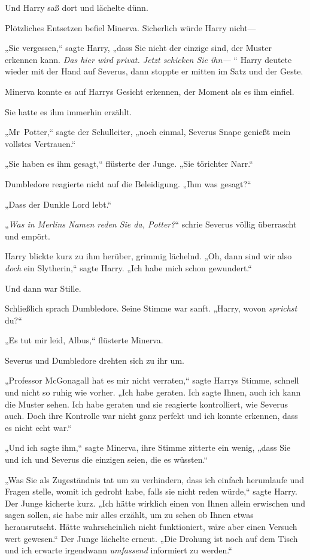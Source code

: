 {Und Harry saß dort und lächelte dünn.

Plötzliches Entsetzen befiel Minerva. Sicherlich würde Harry nicht—

„Sie vergessen,“ sagte Harry, „dass Sie nicht der einzige sind, der Muster erkennen kann. \emph{Das hier wird privat. Jetzt schicken Sie ihn—} “ Harry deutete wieder mit der Hand auf Severus, dann stoppte er mitten im Satz und der Geste.

Minerva konnte es auf Harrys Gesicht erkennen, der Moment als es ihm einfiel.

Sie hatte es ihm immerhin erzählt.

„Mr~Potter,“ sagte der Schulleiter, „noch einmal, Severus Snape genießt mein vollstes Vertrauen.“

„Sie haben es ihm gesagt,“ flüsterte der Junge. „Sie törichter Narr.“

Dumbledore reagierte nicht auf die Beleidigung. „Ihm was gesagt?“

„Dass der Dunkle Lord lebt.“

„\emph{Was in Merlins Namen reden Sie da, Potter?}“ schrie Severus völlig überrascht und empört.

Harry blickte kurz zu ihm herüber, grimmig lächelnd. „Oh, dann sind wir also \emph{doch} ein Slytherin,“ sagte Harry. „Ich habe mich schon gewundert.“

Und dann war Stille.

Schließlich sprach Dumbledore. Seine Stimme war sanft. „Harry, wovon \emph{sprichst} du?“

„Es tut mir leid, Albus,“ flüsterte Minerva.

Severus und Dumbledore drehten sich zu ihr um.

„Professor McGonagall hat es mir nicht verraten,“ sagte Harrys Stimme, schnell und nicht so ruhig wie vorher. „Ich habe geraten. Ich sagte Ihnen, auch ich kann die Muster sehen. Ich habe geraten und sie reagierte kontrolliert, wie Severus auch. Doch ihre Kontrolle war nicht ganz perfekt und ich konnte erkennen, dass es nicht echt war.“

„Und ich sagte ihm,“ sagte Minerva, ihre Stimme zitterte ein wenig, „dass Sie und ich und Severus die einzigen seien, die es wüssten.“

„Was Sie als Zugeständnis tat um zu verhindern, dass ich einfach herumlaufe und Fragen stelle, womit ich gedroht habe, falls sie nicht reden würde,“ sagte Harry. Der Junge kicherte kurz. „Ich hätte wirklich einen von Ihnen allein erwischen und sagen sollen, sie habe mir alles erzählt, um zu sehen ob Ihnen etwas herausrutscht. Hätte wahrscheinlich nicht funktioniert, wäre aber einen Versuch wert gewesen.“ Der Junge lächelte erneut. „Die Drohung ist noch auf dem Tisch und ich erwarte irgendwann \emph{umfassend} informiert zu werden.“

}
